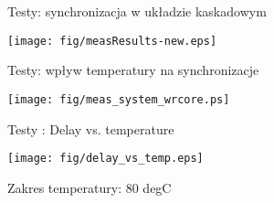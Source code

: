 \documentclass[compress,red]{beamer}
\begin{document}
\begin{frame}{Testy: synchronizacja w układzie kaskadowym}

    \begin{center}
    \texttt{[image: fig/measResults-new.eps]}
    \end{center}


\end{frame}
\begin{frame}{Testy: wpływ temperatury na synchronizacje}

    \begin{center}
    \texttt{[image: fig/meas\_system\_wrcore.ps]}
    \end{center}

\end{frame}
\begin{frame}{Testy : Delay vs. temperature}

  \begin{center}
  \texttt{[image: fig/delay\_vs\_temp.eps]}

  Zakres temperatury: 80 degC
  \end{center}

\end{frame}
\end{document}
